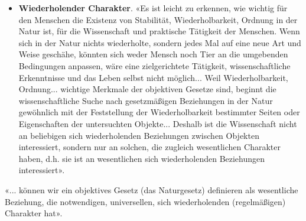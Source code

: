 \documentclass[11pt,a4paper]{article}
\begin{document}
\begin{itemize}
\item \textbf{Wiederholender Charakter}. «Es ist leicht zu erkennen, wie
  wichtig für den Menschen die Existenz von Stabilität, Wiederholbarkeit,
  Ordnung in der Natur ist, für die Wissenschaft und praktische Tätigkeit der
  Menschen. Wenn sich in der Natur nichts wiederholte, sondern jedes Mal auf
  eine neue Art und Weise geschähe, könnten sich weder Mensch noch Tier an die
  umgebenden Bedingungen anpassen, wäre eine zielgerichtete Tätigkeit,
  wissenschaftliche Erkenntnisse und das Leben selbst nicht möglich... Weil
  Wiederholbarkeit, Ordnung... wichtige Merkmale der objektiven Gesetze sind,
  beginnt die wissenschaftliche Suche nach gesetzmäßigen Beziehungen in der
  Natur gewöhnlich mit der Feststellung der Wiederholbarkeit bestimmter Seiten
  oder Eigenschaften der untersuchten Objekte... Deshalb ist die Wissenschaft
  nicht an beliebigen sich wiederholenden Beziehungen zwischen Objekten
  interessiert, sondern nur an solchen, die zugleich wesentlichen Charakter
  haben, d.h. sie ist an wesentlichen sich wiederholenden Beziehungen
  interessiert».
\end{itemize}
«... können wir ein objektives Gesetz (das Naturgesetz) definieren als
wesentliche Beziehung, die notwendigen, universellen, sich wiederholenden
(regelmäßigen) Charakter hat».
\end{document}
